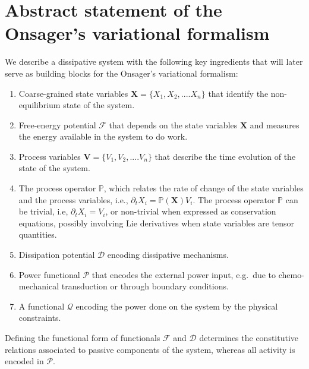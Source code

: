 \section{Abstract statement of the Onsager's variational formalism}

We describe a dissipative system with the following key ingredients that will later serve as building blocks for the Onsager's variational formalism:
\begin{enumerate}
	\item Coarse-grained state variables $\bm{X} = \{X_1, X_2, ....X_n \}$ that identify the non-equilibrium state of the system.
	\item Free-energy potential $\mathcal{F}$ that depends on the state variables $\bm{X}$ and measures the energy available in the system to do work.
	\item Process variables $\bm{V} = \{V_1, V_2, ....V_n \}$ that describe the time evolution of the state of the system.
	\item The process operator $\mathbb{P}$, which relates the rate of change of the state variables and the process variables, i.e., $ \partial_t X_i = \mathbb{P}(\bm{X})V_i $. The process operator $\mathbb{P}$ can be trivial, i.e, $	\partial_t X_i=V_i $, or non-trivial when expressed as conservation equations, possibly involving Lie derivatives when state variables are tensor quantities.
	\item Dissipation potential $\mathcal{D}$ encoding dissipative mechanisms.
	\item Power functional $\mathcal{P}$ that encodes the external power input, e.g.~due to chemo-mechanical transduction or through boundary conditions. 
	\item A functional $\mathcal{Q}$ encoding the power done on the system by the physical constraints.
\end{enumerate}

Defining the functional form of functionals $\mathcal{F}$ and $\mathcal{D}$ determines the constitutive relations associated to passive components of the system, whereas all activity is encoded in $\mathcal{P}$.

